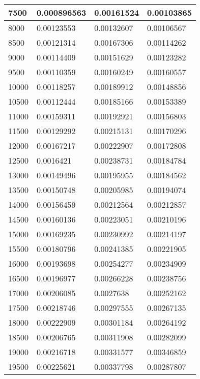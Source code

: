 \documentclass{article}
\begin{document}
\begin{table}[]
\begin{tabular}{|l|l|l|l|}
		7500   &  0.000896563   & 	0.00161524	 &  0.00103865  \\ \hline
		8000   &  0.00123553    & 	0.00132607	 &  0.00106567  \\ \hline
		8500   &  0.00121314    & 	0.00167306	 &  0.00114262  \\ \hline
		9000   &  0.00114409    & 	0.00151629	 &  0.00123282  \\ \hline
		9500   &  0.00110359    & 	0.00160249	 &  0.00160557  \\ \hline
		10000  &  0.00118257    & 	0.00189912	 &  0.00148856  \\ \hline
		10500  &  0.00112444    & 	0.00185166	 &  0.00153389  \\ \hline
		11000  &  0.00159311    & 	0.00192921	 &  0.00156803  \\ \hline
		11500  &  0.00129292    & 	0.00215131	 &  0.00170296  \\ \hline
		12000  &  0.00167217    & 	0.00222907	 &  0.00172808  \\ \hline
		12500  &  0.0016421	    &   0.00238731	 &  0.00184784  \\ \hline
		13000  &  0.00149496    & 	0.00195955	 &  0.00184562  \\ \hline
		13500  &  0.00150748    & 	0.00205985	 &  0.00194074  \\ \hline
		14000  &  0.00156459    & 	0.00212564	 &  0.00212857  \\ \hline
		14500  &  0.00160136    & 	0.00223051	 &  0.00210196  \\ \hline
		15000  &  0.00169235    & 	0.00230992	 &  0.00214197  \\ \hline
		15500  &  0.00180796    & 	0.00241385	 &  0.00221905  \\ \hline
		16000  &  0.00193698    & 	0.00254277	 &  0.00234909  \\ \hline
		16500  &  0.00196977    & 	0.00266228	 &  0.00238756  \\ \hline
		17000  &  0.00206085    & 	0.0027638	 &  0.00252162  \\ \hline
		17500  &  0.00218746    & 	0.00297555	 &  0.00267135  \\ \hline
		18000  &  0.00222909    & 	0.00301184	 &  0.00264192  \\ \hline
		18500  &  0.00206765    & 	0.00311908	 &  0.00282099  \\ \hline
		19000  &  0.00216718    & 	0.00331577	 &  0.00346859  \\ \hline
		19500  &  0.00225621    & 	0.00337798	 &  0.00287807  \\ \hline

\end{tabular}
\end{table}
\end{document}
